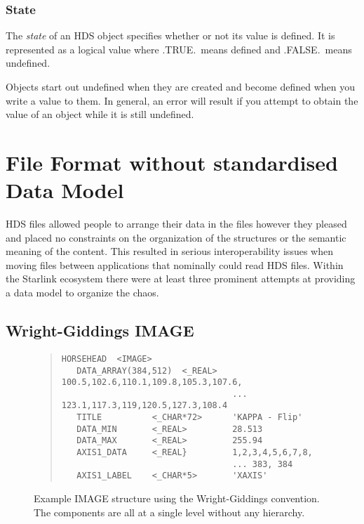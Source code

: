 \documentclass[final,authoryear,5p,times,twocolumn]{elsarticle}
\begin{document}
{\subsubsection{State}

The \emph{state} of an HDS object specifies whether or not its value is
defined. It is represented as a logical value where .TRUE.\ means
defined and .FALSE.\ means undefined.

Objects start out undefined when they are created and become defined
when you write a value to them. In general, an error will result if
you attempt to obtain the value of an object while it is still
undefined.


\section{File Format without standardised Data Model}

HDS files allowed people to arrange their data in the files however
they pleased and placed no constraints on the organization of the
structures or the semantic meaning of the content. This resulted in
serious interoperability issues when moving files between applications
that nominally could read HDS files. Within the Starlink ecosystem
there were at least three prominent attempts at providing a data model
to organize the chaos.

\subsection{Wright-Giddings IMAGE}

\begin{figure*}[t]
\begin{minipage}{\textwidth}
\begin{quote}
\small
\begin{verbatim}
HORSEHEAD  <IMAGE>
   DATA_ARRAY(384,512)  <_REAL>   100.5,102.6,110.1,109.8,105.3,107.6,
                                  ... 123.1,117.3,119,120.5,127.3,108.4
   TITLE          <_CHAR*72>      'KAPPA - Flip'
   DATA_MIN       <_REAL>         28.513
   DATA_MAX       <_REAL>         255.94
   AXIS1_DATA     <_REAL}         1,2,3,4,5,6,7,8,
                                  ... 383, 384
   AXIS1_LABEL    <_CHAR*5>       'XAXIS'
\end{verbatim}
\end{quote}
\caption{Example IMAGE structure using the Wright-Giddings
  convention. The components are all at a single level without any hierarchy.}
\end{minipage}
\end{figure*}

}
\end{document}
